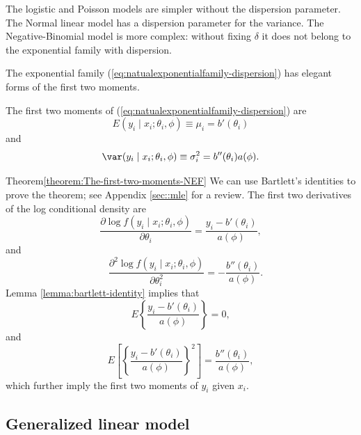 

The logistic and Poisson models are simpler without the dispersion parameter.
The Normal linear model has a dispersion parameter for the variance.
The Negative-Binomial model is more complex: without fixing $\delta$
it does not belong to the exponential family with dispersion. 

The exponential family (\ref{eq:natualexponentialfamily-dispersion})
has elegant forms of the first two moments. 

 

\begin{theorem}
\label{theorem:The-first-two-moments-NEF}The first two moments of (\ref{eq:natualexponentialfamily-dispersion})
are
$$
E(y_{i}\mid x_{i};\theta_{i},\phi)\equiv\mu_{i}=b'(\theta_{i})
$$
and
$$
\var(y_{i}\mid x_{i};\theta_{i},\phi)\equiv\sigma_{i}^{2}=b''(\theta_{i})a(\phi).
$$ 
\end{theorem}



\begin{myproof}{Theorem}{\ref{theorem:The-first-two-moments-NEF}}
We can use Bartlett's identities \citep{bartlett1953approximate} to prove the theorem; see Appendix \ref{sec::mle} for a review. 
The first two derivatives of the log conditional density are
\[
\frac{\partial\log f(y_{i}\mid x_{i};\theta_{i},\phi)}{\partial\theta_{i}}=\frac{y_{i}-b'(\theta_{i})}{a(\phi)},\]
and
\[
\quad\frac{\partial^{2}\log f(y_{i}\mid x_{i};\theta_{i},\phi)}{\partial\theta_{i}^{2}}=-\frac{b''(\theta_{i})}{a(\phi)}.
\]
Lemma \ref{lemma:bartlett-identity} implies that
\[
E\left\{ \frac{y_{i}-b'(\theta_{i})}{a(\phi)}\right\} =0,
\]
and
\[
 E\left[\left\{ \frac{y_{i}-b'(\theta_{i})}{a(\phi)}\right\} ^{2}\right]=\frac{b''(\theta_{i})}{a(\phi)},
\]
which further imply the first two moments of $y_{i}$ given $x_i$. 
\end{myproof}


\subsection{Generalized linear model}

